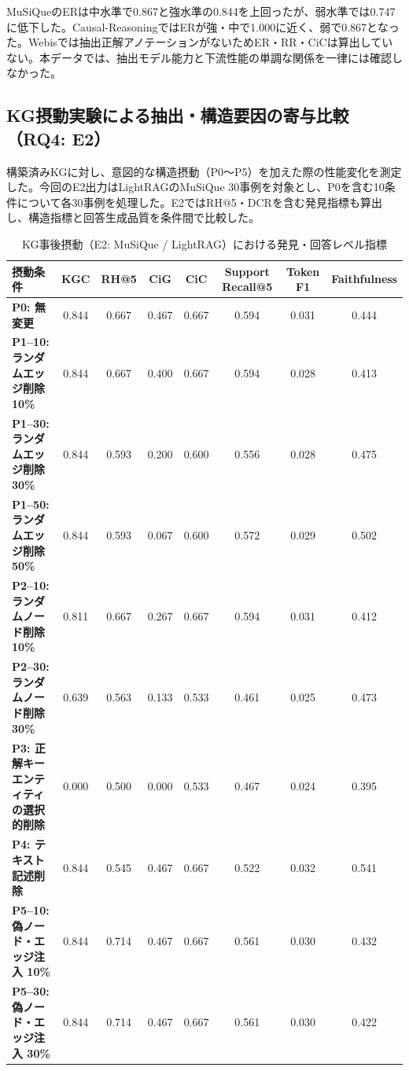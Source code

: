 \documentclass[a4j,dvipdfmx]{jsarticle}
\begin{document}
MuSiQueのERは中水準で0.867と強水準の0.844を上回ったが、弱水準では0.747に低下した。Causal-ReasoningではERが強・中で1.000に近く、弱で0.867となった。Webisでは抽出正解アノテーションがないためER・RR・CiCは算出していない。本データでは、抽出モデル能力と下流性能の単調な関係を一律には確認しなかった。

\subsection{KG摂動実験による抽出・構造要因の寄与比較（RQ4: E2）}
構築済みKGに対し、意図的な構造摂動（P0〜P5）を加えた際の性能変化を測定した。今回のE2出力はLightRAGのMuSiQue 30事例を対象とし、P0を含む10条件について各30事例を処理した。E2ではRH@5・DCRを含む発見指標も算出し、構造指標と回答生成品質を条件間で比較した。

\begin{table}[t]
\centering
\caption{KG事後摂動（E2: MuSiQue / LightRAG）における発見・回答レベル指標}
\label{tab:perturbation_results}
\small
\begin{tabular}{l|ccccc|cc}
\hline
\textbf{摂動条件} & \textbf{KGC} & \textbf{RH@5} & \textbf{CiG} & \textbf{CiC} & \textbf{Support Recall@5} & \textbf{Token F1} & \textbf{Faithfulness} \\
\hline
\textbf{P0: 無変更} & 0.844 & 0.667 & 0.467 & 0.667 & 0.594 & 0.031 & 0.444 \\
\textbf{P1--10: ランダムエッジ削除 10\%} & 0.844 & 0.667 & 0.400 & 0.667 & 0.594 & 0.028 & 0.413 \\
\textbf{P1--30: ランダムエッジ削除 30\%} & 0.844 & 0.593 & 0.200 & 0.600 & 0.556 & 0.028 & 0.475 \\
\textbf{P1--50: ランダムエッジ削除 50\%} & 0.844 & 0.593 & 0.067 & 0.600 & 0.572 & 0.029 & 0.502 \\
\textbf{P2--10: ランダムノード削除 10\%} & 0.811 & 0.667 & 0.267 & 0.667 & 0.594 & 0.031 & 0.412 \\
\textbf{P2--30: ランダムノード削除 30\%} & 0.639 & 0.563 & 0.133 & 0.533 & 0.461 & 0.025 & 0.473 \\
\textbf{P3: 正解キーエンティティの選択的削除} & 0.000 & 0.500 & 0.000 & 0.533 & 0.467 & 0.024 & 0.395 \\
\textbf{P4: テキスト記述削除} & 0.844 & 0.545 & 0.467 & 0.667 & 0.522 & 0.032 & 0.541 \\
\textbf{P5--10: 偽ノード・エッジ注入 10\%} & 0.844 & 0.714 & 0.467 & 0.667 & 0.561 & 0.030 & 0.432 \\
\textbf{P5--30: 偽ノード・エッジ注入 30\%} & 0.844 & 0.714 & 0.467 & 0.667 & 0.561 & 0.030 & 0.422 \\
\hline
\end{tabular}
\end{table}
\end{document}
